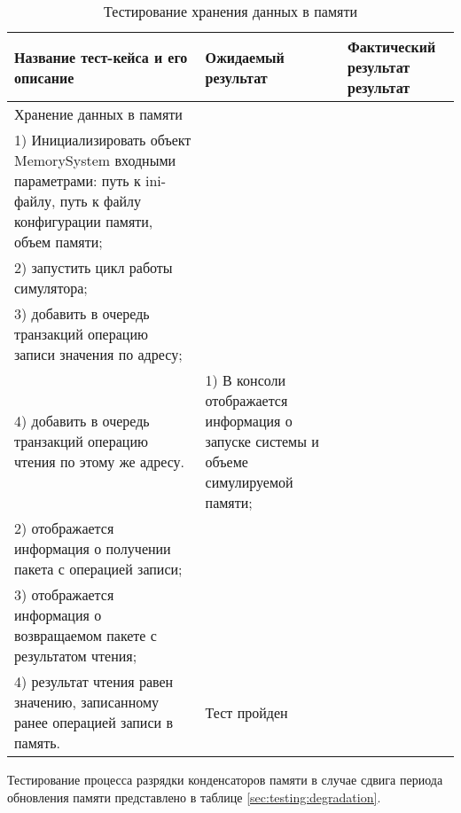 \begin{longtable}[l]{| >{\raggedright}p{}                     
                     | >{\raggedright}p{}
                     | >{\raggedright\arraybackslash}p{}|}
  \caption{Тестирование хранения данных в памяти}
  \label{sec:testing:data_storing} \tabularnewline

  \hline
      Название тест-кейса и его описание & Ожидаемый результат & Фактический результат результат \\
   \hline
   Хранение данных в памяти\\ 
   1) Инициализировать объект MemorySystem входными параметрами: путь к ini-файлу, путь к файлу конфигурации памяти, объем памяти; \\
   2) запустить цикл работы симулятора;\\
   3) добавить в очередь транзакций операцию записи значения по адресу;\\
   4) добавить в очередь транзакций операцию чтения по этому же адресу.

   &
   1) В консоли отображается информация о запуске системы и объеме симулируемой памяти;\\
   2) отображается информация о получении пакета с операцией записи;\\
   3) отображается информация о возвращаемом пакете с результатом чтения;\\
   4) результат чтения равен значению, записанному ранее операцией записи в память.

   &
   Тест пройден \\
   \hline
\end{longtable}

Тестирование процесса разрядки конденсаторов памяти в случае сдвига периода обновления памяти представлено в таблице \ref{sec:testing:degradation}.
\pagebreak

